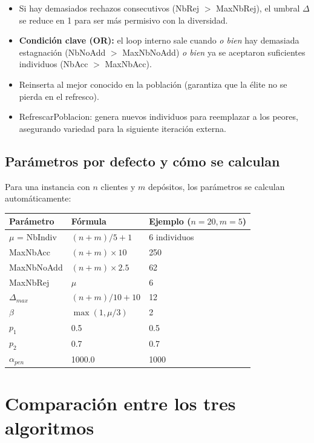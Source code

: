 \documentclass[12pt,a4paper]{article}
\begin{document}
\begin{itemize}[leftmargin=2cm]
\item[\textbf{L.25-27}] Si hay demasiados rechazos consecutivos (NbRej $>$ MaxNbRej), el umbral $\Delta$ se reduce en 1 para ser más permisivo con la diversidad.
\item[\textbf{L.28}] \textbf{Condición clave (OR):} el loop interno sale cuando \textit{o bien} hay demasiada estagnación (NbNoAdd $>$ MaxNbNoAdd) \textit{o bien} ya se aceptaron suficientes individuos (NbAcc $>$ MaxNbAcc).
\item[\textbf{L.29}] Reinserta al mejor conocido en la población (garantiza que la élite no se pierda en el refresco).
\item[\textbf{L.30}] RefrescarPoblacion: genera nuevos individuos para reemplazar a los peores, asegurando variedad para la siguiente iteración externa.
\end{itemize}

\subsection{Parámetros por defecto y cómo se calculan}

Para una instancia con $n$ clientes y $m$ depósitos, los parámetros se calculan automáticamente:

\begin{center}
\begin{tabular}{lll}
\toprule
Parámetro & Fórmula & Ejemplo ($n=20, m=5$) \\
\midrule
$\mu$ = NbIndiv & $(n+m)/5 + 1$ & 6 individuos \\
MaxNbAcc & $(n+m) \times 10$ & 250 \\
MaxNbNoAdd & $(n+m) \times 2.5$ & 62 \\
MaxNbRej & $\mu$ & 6 \\
$\Delta_{max}$ & $(n+m)/10 + 10$ & 12 \\
$\beta$ & $\max(1, \mu/3)$ & 2 \\
$p_1$ & 0.5 & 0.5 \\
$p_2$ & 0.7 & 0.7 \\
$\alpha_{pen}$ & 1000.0 & 1000 \\
\bottomrule
\end{tabular}
\end{center}

\section{Comparación entre los tres algoritmos}
\end{document}
